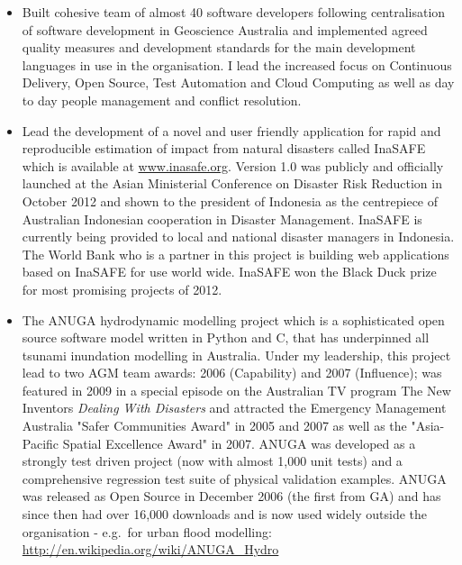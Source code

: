 \documentclass[11pt,a4paper]{article}
\begin{document}
\begin{itemize}
  \item Built cohesive team of almost 40 software developers following centralisation of software development in Geoscience Australia and implemented agreed quality measures and development standards for the main development languages in use in the organisation. I lead the increased focus on Continuous Delivery, Open Source, Test Automation and Cloud Computing as well as day to day people management and conflict resolution.
  \item Lead the development of a novel and user friendly application for rapid and reproducible estimation of impact from natural disasters called InaSAFE which is available at \url{www.inasafe.org}.
  Version 1.0 was publicly and officially launched at the Asian Ministerial Conference on Disaster Risk Reduction in October 2012 and shown to the president of Indonesia as the centrepiece of Australian Indonesian cooperation in Disaster Management. InaSAFE is currently being provided to local and national disaster managers in Indonesia. The World Bank who is a partner in this project is building web applications based on InaSAFE for use world wide.
  InaSAFE won the Black Duck prize for most promising projects of 2012. %
  \item The ANUGA hydrodynamic modelling project which is a sophisticated open source software model written in Python and C, that has underpinned all tsunami inundation modelling in Australia. Under my leadership, this project lead to two AGM team awards: 2006 (Capability) and 2007 (Influence); was featured in 2009 in a special episode on the Australian TV program The New Inventors \emph{Dealing With Disasters} and attracted the Emergency Management Australia "Safer Communities Award" in 2005 and 2007 as well as the "Asia-Pacific Spatial Excellence Award" in 2007. ANUGA was developed as a strongly test driven project (now with almost 1,000 unit tests) and a comprehensive regression test suite of physical validation examples. ANUGA was released as Open Source in December 2006 (the first from GA) and has since then had over 16,000 downloads and is now used widely outside the organisation - e.g.\ for urban flood modelling: \url{http://en.wikipedia.org/wiki/ANUGA_Hydro}

\end{itemize}
\end{document}
